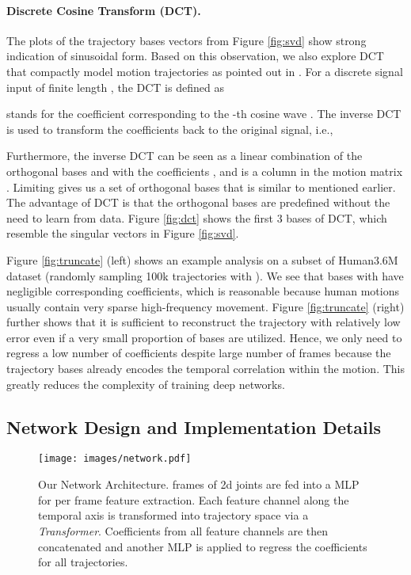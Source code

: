 \documentclass{bmvc2k}
\begin{document}
\paragraph{Discrete Cosine Transform (DCT).} The plots of the trajectory bases vectors from Figure \ref{fig:svd} show strong indication of sinusoidal form. Based on this observation, we also explore DCT that compactly model motion trajectories as pointed out in \cite{akhter2009nonrigid}.
For a discrete signal input  of finite length , the DCT is defined as

 stands for the coefficient corresponding to the -th cosine wave . The inverse DCT is used to transform the coefficients back to the original signal, i.e., 

Furthermore, the inverse DCT can be seen as a linear combination of the orthogonal bases  and  with the coefficients , and  is a column in the motion matrix . Limiting  gives us a set of  orthogonal bases that is similar to  mentioned earlier. The advantage of DCT is that the orthogonal bases are predefined without the need to learn from data. Figure \ref{fig:dct} shows the first 3 bases of DCT, which resemble the singular vectors in Figure \ref{fig:svd}.

Figure \ref{fig:truncate} (left) shows an example analysis on a subset of Human3.6M dataset (randomly sampling 100k trajectories with ). We see that bases with  have negligible corresponding coefficients, which is reasonable because human motions usually contain very sparse high-frequency movement. Figure \ref{fig:truncate} (right) further shows that it is sufficient to reconstruct the trajectory with relatively low error even if a very small proportion of bases are utilized. Hence, we only need to regress a low number of coefficients despite large number of frames because the trajectory bases already encodes the temporal correlation within the motion. This greatly reduces the complexity of training deep networks.

\subsection{Network Design and Implementation Details}
\label{sec:network}

\begin{figure*}
\texttt{[image: images/network.pdf]}
\caption{Our Network Architecture.  frames of  2d joints are fed into a MLP for per frame feature extraction. Each feature channel along the temporal axis is transformed into trajectory space via a \textit{Transformer}. Coefficients from all feature channels are then concatenated and another MLP is applied to regress the  coefficients for all  trajectories.}
\label{fig:network}
\end{figure*}
\end{document}
